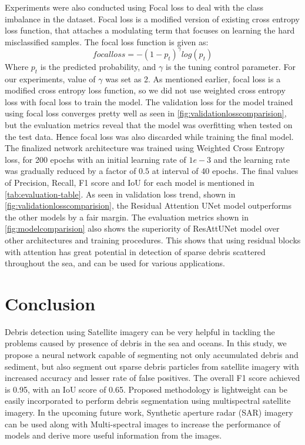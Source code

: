 \documentclass[review]{elsarticle}
\begin{document}
Experiments were also conducted using Focal loss\cite{8417976} to deal with the class imbalance in the dataset. Focal loss is a modified version of existing cross entropy loss function, that attaches a modulating term that focuses on learning the hard misclassified samples. The focal loss function is given as:
\[focal loss = -(1-p_t)^\gamma log(p_t)\]
Where \(p_t\) is the predicted probability, and \(\gamma\) is the tuning control parameter. For our experiments, value of \(\gamma\) was set as 2. As mentioned earlier, focal loss is a modified cross entropy loss function, so we did not use weighted cross entropy loss with focal loss to train the model. The validation loss for the model trained using focal loss converges pretty well as seen in \autoref{fig:validationlosscomparision}, but the evaluation metrics reveal that the model was overfitting when tested on the test data. Hence focal loss was also discarded while training the final model.
The finalized network architecture was trained using Weighted Cross Entropy loss, for 200 epochs with an initial learning rate of \(1e-3\) and the learning rate was gradually reduced by a factor of \(0.5\) at interval of 40 epochs. The final values of Precision, Recall, F1 score and IoU for each model is mentioned in \autoref{tab:evaluation-table}.
As seen in validation loss trend, shown in \autoref{fig:validationlosscomparision}, the Residual Attention UNet model outperforms the other models by a fair margin. The evaluation metrics shown in \autoref{fig:modelcomparision} also shows the superiority of ResAttUNet model over other architectures and training procedures. This shows that using residual blocks with attention has great potential in detection of sparse debris scattered throughout the sea, and can be used for various applications.

\section{Conclusion}

Debris detection using Satellite imagery can be very helpful in tackling the problems caused by presence of debris in the sea and oceans. In this study, we propose a neural network capable of segmenting not only accumulated debris and sediment, but also segment out sparse debris particles from satellite imagery with increased accuracy and lesser rate of false positives. The overall F1 score achieved is 0.95, with an IoU score of 0.65. Proposed methodology is lightweight can be easily incorporated to perform debris segmentation using multispectral satellite imagery. In the upcoming future work, Synthetic aperture radar (SAR) imagery can be used along with Multi-spectral images to increase the performance of models and derive more useful information from the images.


\end{document}
